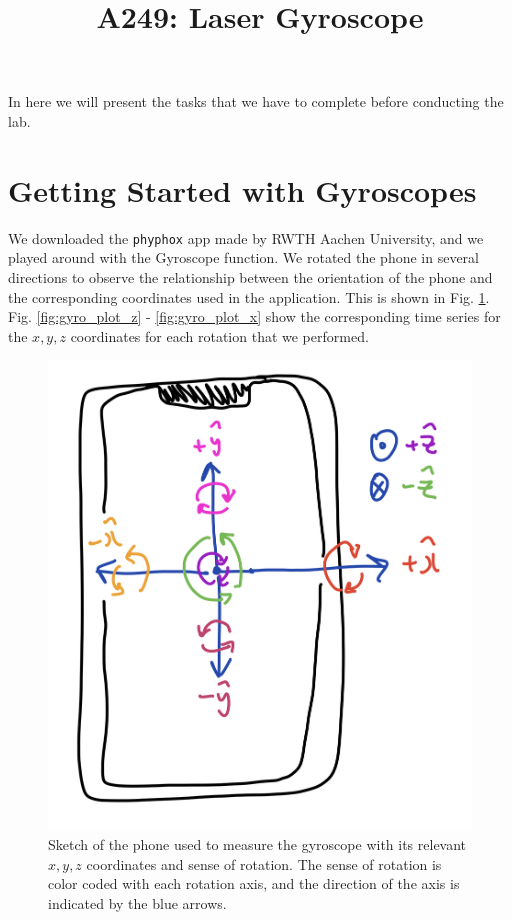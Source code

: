 \documentclass[a4paper]{article}
\begin{document}
\title{A249: Laser Gyroscope}
\maketitle 

In here we will present the tasks that we have to complete before conducting the lab. 

\section{Getting Started with Gyroscopes} \label{sec:getting_started}

We downloaded the \texttt{phyphox} app made by RWTH Aachen University, and we played around with the Gyroscope function. We rotated the phone in several directions 
to observe the relationship between the orientation of the phone and the corresponding coordinates used in the application. This is shown in Fig. \ref{fig:phone_sketch}. 
Fig. \ref{fig:gyro_plot_z} - \ref{fig:gyro_plot_x} show the corresponding time series for the $x, y, z$ coordinates for each rotation that we performed. 

\begin{figure}[hbt!]
	\centering
	\includegraphics[width=0.6\columnwidth]{Phone_sketch.png}

	\caption{Sketch of the phone used to measure the gyroscope with its relevant $x, y, z$ coordinates and sense of rotation. 
            The sense of rotation is color coded with each rotation axis, and the direction of the axis is indicated by the blue arrows.}
	\label{fig:phone_sketch}
\end{figure}
\end{document}
